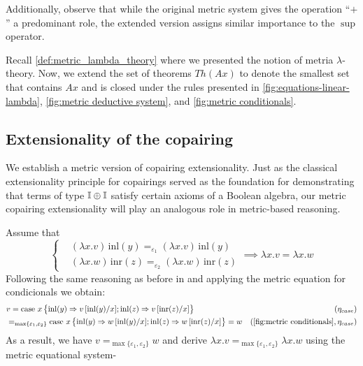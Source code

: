 Additionally, observe that while the original metric system gives the operation ``$+$'' a predominant role, the extended version assigns similar importance to the $\sup$ operator. 


\vspace{5pt}
Recall \autoref{def:metric_lambda_theory} where we presented the notion of metria $\lambda$-theory. Now, we extend the set of theorems \( Th(Ax) \) to denote the smallest set that contains \( Ax \) and is closed under the rules presented in \autoref{fig:equations-linear-lambda}, \autoref{fig:metric deductive system}, and \autoref{fig:metric conditionals}.




\subsection{Extensionality of the copairing}

We establish  a metric version of copairing extensionality. Just as the classical extensionality principle for copairings served as the foundation for demonstrating that terms of type $\mathbb{I} \oplus \mathbb{I}$ satisfy certain axioms of a Boolean algebra, our metric copairing extensionality will play an analogous role in metric-based reasoning.

Assume that 
\[
\left\{
\begin{aligned}
&(\lambda x.v)\, \text{inl}(y) =_{\varepsilon_1} (\lambda x.v)\, \text{inl}(y) \\
&(\lambda x.w)\, \text{inr}(z) =_{\varepsilon_2}(\lambda x.w)\, \text{inr}(z)
\end{aligned}
\right.
\implies \lambda x.v = \lambda x.w
\]
Following the same reasoning as before in  and applying the metric equation for condicionals we obtain:
\begin{equation*}
\begin{split}
  &v =  \text{case } x  
    \left\{ \begin{aligned}
    \inl(y) \Rightarrow v\,[\text{inl}(y)/x] ;  
    \inl(z) \Rightarrow v\,[\text{inr}(z)/x]
  \end{aligned}  \right\} & (\eta_{case})\\
  &=_{\max \{\varepsilon_1,\varepsilon_2\}} \text{case } x  
    \left\{ \begin{aligned}
    \inl(y) \Rightarrow w\,[\text{inl}(y)/x] ;  
    \inl(z) \Rightarrow w\,[\text{inr}(z)/x]
  \end{aligned}  \right\} = w & (\text{\autoref{fig:metric conditionals}},\eta_{case})
\end{split}
\end{equation*}
As a result, we have $v =_{\max \{\varepsilon_1,\varepsilon_2\}} w$ and derive $\lambda x.v =_{\max \{\varepsilon_1,\varepsilon_2\}} \lambda x.w$ using the metric equational system-

